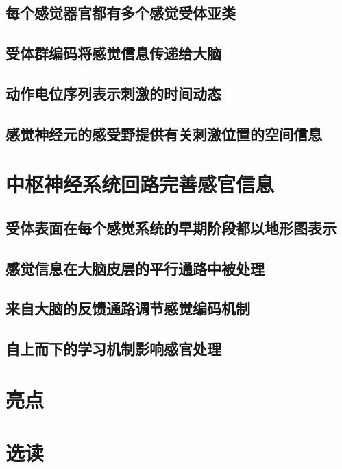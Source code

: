 \subsection{每个感觉器官都有多个感觉受体亚类}


\subsection{受体群编码将感觉信息传递给大脑}


\subsection{动作电位序列表示刺激的时间动态}

\subsection{感觉神经元的感受野提供有关刺激位置的空间信息}



\section{中枢神经系统回路完善感官信息}

\subsection{受体表面在每个感觉系统的早期阶段都以地形图表示}


\subsection{感觉信息在大脑皮层的平行通路中被处理}

\subsection{来自大脑的反馈通路调节感觉编码机制}

\subsection{自上而下的学习机制影响感官处理}


\section{亮点}

\section{选读}